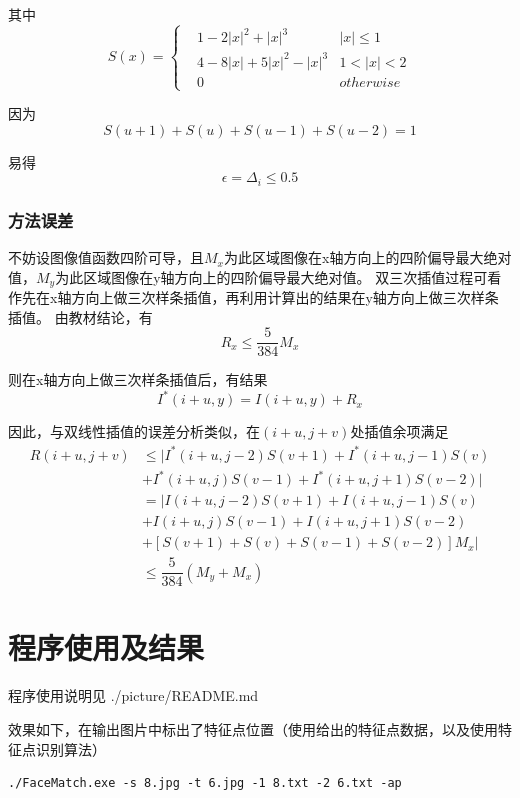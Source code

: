\documentclass[11pt,a4paper]{ctexart}
\begin{document}
其中
\begin{equation*}
S(x) = \left\{
\begin{aligned}
    &1 - 2\lvert x \rvert^2 + \lvert x \rvert^3 & \lvert x \rvert \le 1 \\
    &4 - 8\lvert x \rvert + 5 \lvert x \rvert^2 - \lvert x \rvert^3 & 1 < \lvert x \rvert < 2 \\
    &0 & otherwise
\end{aligned}
\right.
\end{equation*}

因为
$$S(u+1) + S(u) + S(u-1) + S(u-2) = 1$$

易得
$$\epsilon = \Delta_i \le 0.5$$

\subsubsection{方法误差}
不妨设图像值函数四阶可导，且$M_x$为此区域图像在x轴方向上的四阶偏导最大绝对值，$M_y$为此区域图像在y轴方向上的四阶偏导最大绝对值。
双三次插值过程可看作先在x轴方向上做三次样条插值，再利用计算出的结果在y轴方向上做三次样条插值。
由教材结论，有
$$R_x \le \dfrac{5}{384} M_x $$

则在x轴方向上做三次样条插值后，有结果
$$I^*(i + u, y) = I(i + u, y) + R_x$$

因此，与双线性插值的误差分析类似，在$(i + u, j + v)$处插值余项满足
\begin{align*}
R(i + u, j + v) &\le \lvert I^*(i + u, j - 2) S(v + 1) + I^*(i + u, j - 1) S(v) \\
&+ I^*(i + u, j) S(v - 1) + I^*(i + u, j + 1) S(v - 2) \rvert \\
&= \lvert I(i + u, j - 2) S(v + 1) + I(i + u, j - 1) S(v) \\
&+ I(i + u, j) S(v - 1) + I(i + u, j + 1) S(v - 2) \\
&+ \left[ S(v + 1) + S(v) + S(v - 1) + S(v - 2) \right] M_x \rvert \\
&\le \dfrac{5}{384} (M_y + M_x)
\end{align*}

\section{程序使用及结果}
程序使用说明见 ./picture/README.md

效果如下，在输出图片中标出了特征点位置（使用给出的特征点数据，以及使用特征点识别算法）

\clearpage
\begin{lstlisting}[frame=single]
./FaceMatch.exe -s 8.jpg -t 6.jpg -1 8.txt -2 6.txt -ap
\end{lstlisting}
\end{document}
